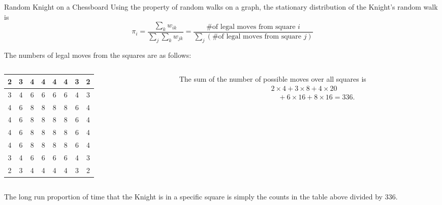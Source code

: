\documentclass[letterpaper, mathserif]{beamer}
\begin{document}
\begin{frame}{Random Knight on a Chessboard}
Using the property of random walks on a graph, the stationary distribution of the Knight's random walk is
\[
\pi_i=\frac{\sum_k w_{ik}}{\sum_j\sum_k w_{jk}}=\frac{{\text{\# of legal moves from square $i$}}}{\sum_j (\text{\# of legal moves from square $j$})}
\]

The numbers of legal moves from the squares are as follows:\smallskip

\begin{columns}
\begin{column}{0.4\textwidth}
\small\tabcolsep=5pt
\begin{tabular}{|c|c|c|c|c|c|c|c|}\hline
\cellcolor{orange}2 & \cellcolor{yellow}3 & \cellcolor{pink}4 & \cellcolor{pink}4 & \cellcolor{pink}4 & \cellcolor{pink}4 & \cellcolor{yellow}3 & \cellcolor{orange}2\\\hline
\cellcolor{yellow}3 & \cellcolor{pink}4 & \cellcolor{cyan}6 & \cellcolor{cyan}6 & \cellcolor{cyan}6 & \cellcolor{cyan}6 & \cellcolor{pink}4 & \cellcolor{yellow}3\\\hline
\cellcolor{pink}4 & \cellcolor{cyan}6 & 8 & 8 & 8 & 8 & \cellcolor{cyan}6 & \cellcolor{pink}4\\\hline
\cellcolor{pink}4 & \cellcolor{cyan}6 & 8 & 8 & 8 & 8 & \cellcolor{cyan}6 & \cellcolor{pink}4\\\hline
\cellcolor{pink}4 & \cellcolor{cyan}6 & 8 & 8 & 8 & 8 & \cellcolor{cyan}6 & \cellcolor{pink}4\\\hline
\cellcolor{pink}4 & \cellcolor{cyan}6 & 8 & 8 & 8 & 8 & \cellcolor{cyan}6 & \cellcolor{pink}4\\\hline
\cellcolor{yellow}3 & \cellcolor{pink}4 & \cellcolor{cyan}6 & \cellcolor{cyan}6 & \cellcolor{cyan}6 & \cellcolor{cyan}6 & \cellcolor{pink}4 & \cellcolor{yellow}3\\\hline
\cellcolor{orange}2 & \cellcolor{yellow}3 & \cellcolor{pink}4 & \cellcolor{pink}4 & \cellcolor{pink}4 & \cellcolor{pink}4 & \cellcolor{yellow}3 & \cellcolor{orange}2\\\hline
\end{tabular}
\end{column}
\begin{column}{0.58\textwidth}
The sum of the number of possible moves over all squares is
\begin{align*}
&2\times4+3\times8+4\times20\\
&\quad+6\times16+8\times 16=336.
\end{align*}
\end{column}
\end{columns}
\medskip

The long run proportion of time that the Knight is in a specific square is
simply the counts in the table above divided by 336.

\end{frame}
\end{document}
